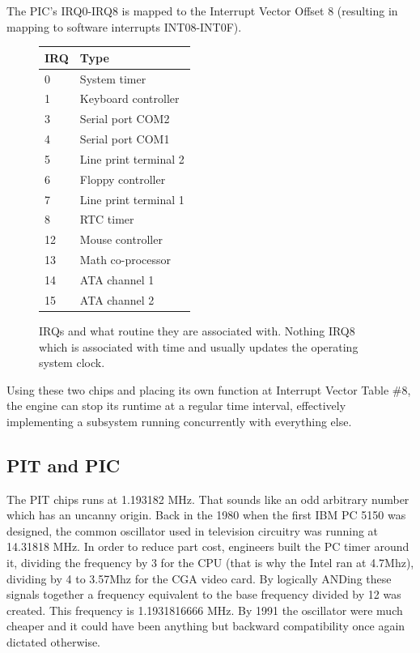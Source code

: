 The PIC's IRQ0-IRQ8 is mapped to the Interrupt Vector Offset 8 (resulting in mapping to software interrupts INT08-INT0F).\\

\par
\begin{figure}[H]
\centering
\begin{tabularx}{\textwidth}{ X X  }
  \toprule
  \textbf{IRQ} & \textbf{Type} \\ \bottomrule
0 & System timer \\
1 & Keyboard controller \\
3 & Serial port COM2 \\ 
4 & Serial port COM1 \\
5 & Line print terminal 2 \\
6 & Floppy controller \\
7 & Line print terminal 1 \\
8 & RTC timer \\
12 & Mouse controller \\
13 & Math co-processor \\
14 & ATA channel 1 \\
15 & ATA channel 2  \\
\bottomrule
\end{tabularx}
\caption{IRQs and what routine they are associated with. Nothing IRQ8 which is associated with time and usually updates the operating system clock.}
\end{figure}
Using these two chips and placing its own function at Interrupt Vector Table \#8, the engine can stop its runtime at a regular time interval, effectively implementing a subsystem running concurrently with everything else.\\



\subsection{PIT and PIC}
The PIT chips runs at 1.193182 MHz. That sounds like an odd arbitrary number which has an uncanny origin. Back in the 1980 when the first IBM PC 5150 was designed, the common oscillator used in television circuitry was running at 14.31818 MHz. In order to reduce part cost, engineers built the PC timer around it, dividing the frequency by 3 for the CPU (that is why the Intel ran at 4.7Mhz), dividing by 4 to 3.57Mhz for the CGA video card. By logically ANDing these signals together a frequency equivalent to the base frequency divided by 12 was created. This frequency is 1.1931816666 MHz. By 1991 the oscillator were much cheaper and it could have been anything but backward compatibility once again dictated otherwise.\\



